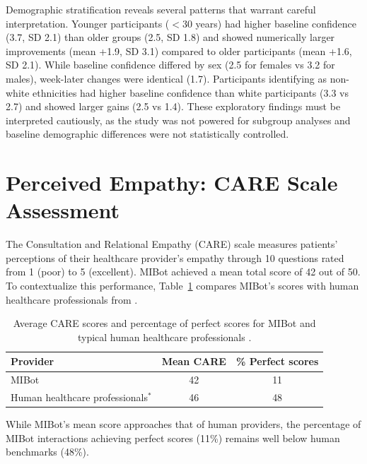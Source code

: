 Demographic stratification reveals several patterns that warrant careful interpretation. Younger participants ($<30$ years) had higher baseline confidence (3.7, SD 2.1) than older groups (2.5, SD 1.8) and showed numerically larger improvements (mean +1.9, SD 3.1) compared to older participants (mean +1.6, SD 2.1). While baseline confidence differed by sex (2.5 for females vs 3.2 for males), week-later changes were identical (1.7). Participants identifying as non-white ethnicities had higher baseline confidence than white participants (3.3 vs 2.7) and showed larger gains (2.5 vs 1.4). These exploratory findings must be interpreted cautiously, as the study was not powered for subgroup analyses and baseline demographic differences were not statistically controlled.


\section{Perceived Empathy: CARE Scale Assessment}
\label{sec:perceived-empathy}

The Consultation and Relational Empathy (CARE) scale \citep{10.1093/fampra/cmh621} measures patients' perceptions of their healthcare provider's empathy through 10 questions rated from 1 (poor) to 5 (excellent). MIBot achieved a mean total score of 42 out of 50. To contextualize this performance, Table~\ref{table:care_comparison} compares MIBot's scores with human healthcare professionals from \citet{Bikker2015}.

\begin{table}[ht]
  \centering
  \small
  \setlength{\tabcolsep}{4pt}
  \renewcommand{\arraystretch}{1.1}
  \begin{tabular}{@{}lcc@{}}
    \toprule
    \textbf{Provider} & \textbf{Mean CARE} & \textbf{\% Perfect scores} \\
    \midrule
    MIBot & 42 & 11 \\
    Human healthcare professionals$^*$ & 46 & 48 \\
    \bottomrule
  \end{tabular}
  \caption{Average CARE scores and percentage of perfect scores for MIBot and typical human healthcare professionals \cite{Bikker2015}.}
  \label{table:care_comparison}
\end{table}

While MIBot's mean score approaches that of human providers, the percentage of MIBot interactions achieving perfect scores (11\%) remains well below human benchmarks (48\%).

